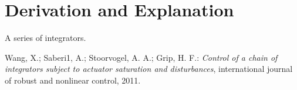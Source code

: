 \documentclass[10pt,a4paper]{article}
\begin{document}

	
	\section{Derivation and Explanation} %
	
	A series of integrators.
	
	
	\begin{thebibliography}{10}		
		Wang, X.; Saberi1, A.; Stoorvogel, A. A.; Grip, H. F.: 
		\textit{Control of a chain of integrators subject to actuator saturation and disturbances}, international journal of robust and nonlinear control, 2011.
	\end{thebibliography}
\end{document}

